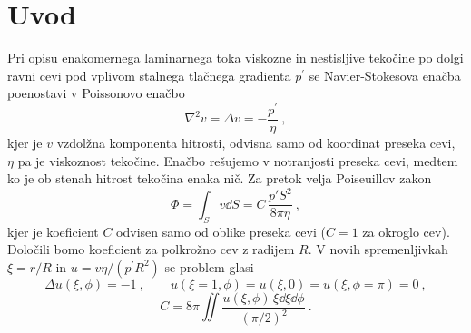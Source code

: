 \documentclass[notoc]{porocilo}
\begin{document}
\maketitle
\section{Uvod}
Pri opisu enakomernega laminarnega toka viskozne in nestisljive
tekočine po dolgi ravni cevi pod vplivom stalnega tlačnega
gradienta $p^{\prime}$ se Navier-Stokesova enačba poenostavi
v Poissonovo enačbo
\begin{equation*}
    \nabla^2 v = \Delta v = - \frac{p^\prime}{\eta}\>,
\end{equation*}
kjer je $v$ vzdolžna komponenta hitrosti, odvisna samo  od
koordinat preseka cevi, $\eta$ pa je viskoznost tekočine.
Enačbo rešujemo v notranjosti preseka cevi, medtem ko
je ob stenah hitrost tekočina enaka nič.  Za pretok velja
Poiseuillov zakon
\begin{equation*}
    \Phi = \int_S v\dd S = C\,\frac{p' S^2}{ 8\pi\eta} \>,
\end{equation*}
kjer je koeficient $C$ odvisen samo od oblike preseka cevi
($C=1$ za okroglo cev).  Določili bomo koeficient za
polkrožno cev z radijem $R$. V novih spremenljivkah $\xi=r/R$
in $u=v \eta/(p^\prime R^2)$ se problem glasi
\begin{equation*}
    \Delta u(\xi,\phi) = -1 \>,\qquad
    u(\xi=1,\phi)=u(\xi,0)=u(\xi,\phi=\pi)=0 \>,
\end{equation*}
\begin{equation*}
    C = 8\pi \iint \frac{u(\xi,\phi)\,\xi\dd \xi \dd\phi}{ {(\pi/2)}^2} \>.
\end{equation*}
\end{document}
